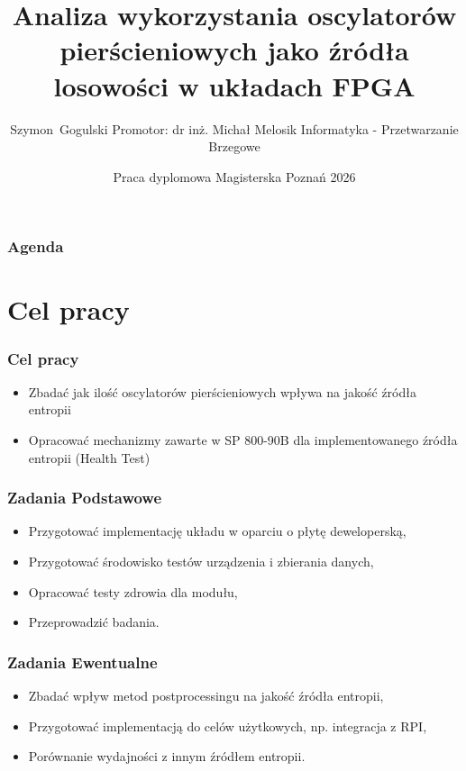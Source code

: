 \documentclass{beamer}
\title[Praca dyplomowa magisterska] %
{Analiza wykorzystania oscylatorów pierścieniowych jako źródła losowości w układach FPGA}
\subtitle{}
\author[Sz. Gogulski] %
{Szymon~Gogulski
\newline
\newline
Promotor: dr inż. Michał Melosik
\newline
\newline
Informatyka - Przetwarzanie Brzegowe
}
\institute[PP] %
{Politechnika Poznańska}
\date[Poznań 2026] %
{Praca dyplomowa Magisterska
\newline
Poznań 2026}
\begin{document}
\frame{\titlepage}
\begin{frame}
\frametitle{Agenda}
\tableofcontents
\end{frame}
\section{Cel pracy}
\begin{frame}
\frametitle{Cel pracy}

\Large
\begin{itemize}
    \item Zbadać jak ilość oscylatorów pierścieniowych wpływa na jakość źródła entropii
    \item Opracować mechanizmy zawarte w SP 800-90B dla implementowanego źródła entropii (Health Test)
\end{itemize}

\end{frame}
\begin{frame}
\frametitle{Zadania Podstawowe}

\Large
\begin{itemize}
    \item Przygotować implementację układu w oparciu o płytę deweloperską,
    \item Przygotować środowisko testów urządzenia i zbierania danych,
    \item Opracować testy zdrowia dla modułu,
    \item Przeprowadzić badania.
\end{itemize}



\end{frame}
\begin{frame}
\frametitle{Zadania Ewentualne}

\Large

\begin{itemize}
    \item Zbadać wpływ metod postprocessingu na jakość źródła entropii,
    \item Przygotować implementacją do celów użytkowych, np. integracja z RPI,
    \item Porównanie wydajności z innym źródłem entropii.
\end{itemize}

\end{frame}
\end{document}

